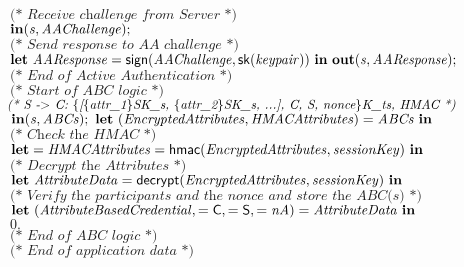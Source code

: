 \begin{tabbing}
$\qquad\qquad \textit{(* Receive challenge from Server *)}$\\
$\qquad\qquad \mathbf{in}(\mathit{s}, \mathit{AAChallenge});$\\
$\qquad\qquad $\\
$\qquad\qquad \textit{(* Send response to AA challenge *)}$\\
$\qquad\qquad \kwl{let}\ \var{AAResponse} = \kwf{sign}(\var{AAChallenge}, \kwf{sk}(\var{keypair}))\ \kwl{in}\ \kwl{out}(\var{s}, \var{AAResponse});$\\
$\qquad\qquad $\\
$\qquad\qquad \textit{(* End of Active Authentication *)}\qquad\qquad $\\
$\qquad\qquad $\\
$\qquad\qquad \textit{(* Start of ABC logic *)}$\\
$\qquad\qquad $\\
$\qquad\qquad \textit{(* S -\ensuremath{>} C: \ensuremath{\{}[\ensuremath{\{}attr{\_}1\ensuremath{\}}SK{\_}s, \ensuremath{\{}attr{\_}2\ensuremath{\}}SK{\_}s, ...], C, S, nonce\ensuremath{\}}K{\_}ts, HMAC *)}$\\
$\qquad\qquad \kwl{in}(\var{s}, \var{ABCs});\ \kwl{let}\ (\var{EncryptedAttributes}, \var{HMACAttributes}) = \var{ABCs}\ \kwl{in}$\\
$\qquad\qquad $\\
$\qquad\qquad \textit{(* Check the HMAC *)}$\\
$\qquad\qquad \kwl{let} = \var{HMACAttributes} = \kwf{hmac}(\var{EncryptedAttributes}, \var{sessionKey})\ \kwl{in}$\\
$\qquad\qquad $\\
$\qquad\qquad \textit{(* Decrypt the Attributes *)}$\\
$\qquad\qquad \kwl{let}\ \var{AttributeData} = \kwf{decrypt}(\var{EncryptedAttributes}, \var{sessionKey})\ \kwl{in}$\\
$\qquad\qquad $\\
$\qquad\qquad \textit{(* Verify the participants and the nonce and store the ABC(s) *)}$\\
$\qquad\qquad \kwl{let}\ (\var{AttributeBasedCredential},  = \kwc{C},  = \kwc{S},  = \var{nA}) = \var{AttributeData}\ \kwl{in}$\\
$\qquad\qquad 0.$\\
$\qquad\qquad $\\
$\qquad\qquad \textit{(* End of ABC logic *)}$\\
$\qquad\qquad $\\
$\qquad\qquad \textit{(* End of application data *)}$\\

\end{tabbing}
